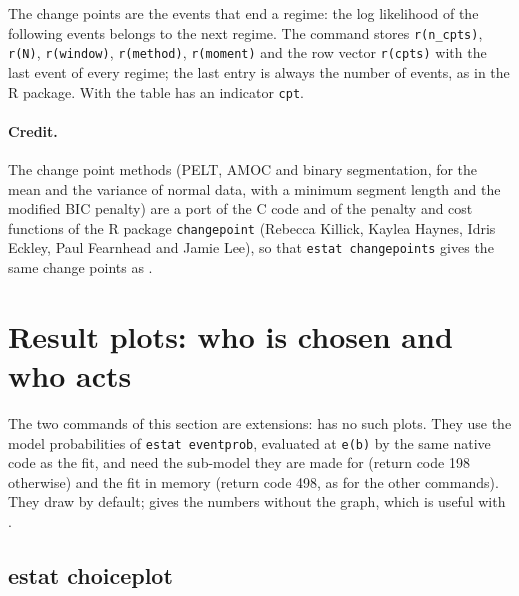 The change points are the events that end a regime: the log likelihood of the following events belongs to the next regime. The command stores \texttt{r(n\_cpts)}, \texttt{r(N)}, \texttt{r(window)}, \texttt{r(method)}, \texttt{r(moment)} and the row vector \texttt{r(cpts)} with the last event of every regime; the last entry is always the number of events, as in the R package. With  the table has an indicator \texttt{cpt}.

\paragraph{Credit.} The change point methods (PELT, AMOC and binary segmentation, for the mean and the variance of normal data, with a minimum segment length and the modified BIC penalty) are a port of the C code and of the penalty and cost functions of the R package \texttt{changepoint} (Rebecca Killick, Kaylea Haynes, Idris Eckley, Paul Fearnhead and Jamie Lee), so that \texttt{estat changepoints} gives the same change points as \goldfish{}.

\section{Result plots: who is chosen and who acts}\label{sec:resultplots}

The two commands of this section are extensions: \goldfish{} has no such plots. They use the model probabilities of \texttt{estat eventprob}, evaluated at \texttt{e(b)} by the same native code as the fit, and need the sub-model they are made for (return code 198 otherwise) and the fit in memory (return code 498, as for the other commands). They draw by default;  gives the numbers without the graph, which is useful with .

\subsection{estat choiceplot}

